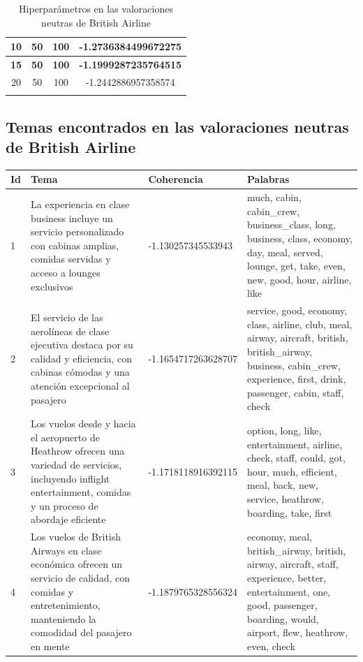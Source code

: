 \documentclass{report}
\begin{document}
{{\begin{longtable}{|c|c|c|c|}
                    \hline
                    10 & 50 & 100 & -1.2736384499672275 \\
                    \hline
                    \textbf{15} & \textbf{50} & \textbf{100} & \textbf{-1.1999287235764515} \\
                    \hline
                    20 & 50 & 100 & -1.2442886957358574 \\
                    \hline
                    \caption{Hiperparámetros en las valoraciones neutras de British Airline}
                \end{longtable}
            \clearpage\subsection{Temas encontrados en las valoraciones neutras de British Airline}
                \label{tab:temas_british_airline_neutras}
                \begin{longtable}{|p{1cm}|p{4cm}|p{4cm}|p{6cm}|}
                    \hline
                    \textbf{Id} & \textbf{Tema} & \textbf{Coherencia} & \textbf{Palabras} \\
                    \hline
                    1 & La experiencia en clase business incluye un servicio personalizado con cabinas amplias, comidas servidas y acceso a lounges exclusivos & -1.130257345533943 & much, cabin, cabin\_crew, business\_class, long, business, class, economy, day, meal, served, lounge, get, take, even, new, good, hour, airline, like \\
                    \hline
                    2 & El servicio de las aerolíneas de clase ejecutiva destaca por su calidad y eficiencia, con cabinas cómodas y una atención excepcional al pasajero & -1.1654717263628707 & service, good, economy, class, airline, club, meal, airway, aircraft, british, british\_airway, business, cabin\_crew, experience, first, drink, passenger, cabin, staff, check \\
                    \hline
                    3 & Los vuelos desde y hacia el aeropuerto de Heathrow ofrecen una variedad de servicios, incluyendo inflight entertainment, comidas y un proceso de abordaje eficiente & -1.1718118916392115 & option, long, like, entertainment, airline, check, staff, could, got, hour, much, efficient, meal, back, new, service, heathrow, boarding, take, first \\
                    \hline
                    4 & Los vuelos de British Airways en clase económica ofrecen un servicio de calidad, con comidas y entretenimiento, manteniendo la comodidad del pasajero en mente & -1.1879765328556324 & economy, meal, british\_airway, british, airway, aircraft, staff, experience, better, entertainment, one, good, passenger, boarding, would, airport, flew, heathrow, even, check \\

\end{longtable}}}
\end{document}
